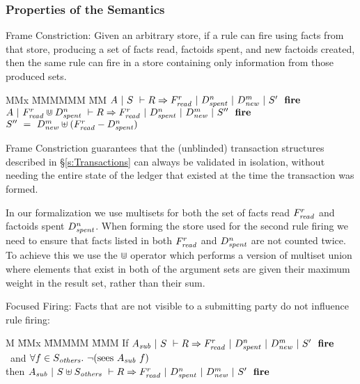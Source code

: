 \subsubsection{Properties of the Semantics}
\label{s:PropertiesOfSemantics}
\begin{theorem}
Frame Constriction:
Given an arbitrary store, if a rule can fire using facts from that store, producing a set of facts read, factoids spent, and new factoids created, then the same rule can fire in a store containing only information from those produced sets.
\end{theorem}
\begin{tabbing}
MMx \= MMMMMM \= MM \kill
{}     \> $A~|~S~\vdash R \Rightarrow F_{\mathit{read}}^r~|~D_{\mathit{spent}}^n~|~D_{\mathit{new}}^m~|~S'~~\textbf{fire}$ \\
   \> $A~|~F_{\mathit{read}}^r \Cup D_{\mathit{spent}}^n~\vdash R \Rightarrow F_{\mathit{read}}^r~|~D_{\mathit{spent}}^n~|~D_{\mathit{new}}^m~|~S''~~\textbf{fire}$ \\
             \>  $S'' ~=~ D_{\mathit{new}}^m \uplus (F_{\mathit{read}}^r - D_{\mathit{spent}}^n)$
\end{tabbing}

Frame Constriction guarantees that the (unblinded) transaction structures described in \S\ref{s:Transactions} can always be validated in isolation, without needing the entire state of the ledger that existed at the time the transaction was formed.

In our formalization we use multisets for both the set of facts read $F^r_{\mathit{read}}$ and factoids spent $D^n_{\mathit{spent}}$. When forming the store used for the second rule firing we need to ensure that facts listed in both $F^r_{\mathit{read}}$ and $D^n_{\mathit{spent}}$ are not counted twice. To achieve this we use the $\Cup$ operator which performs a version of multiset union where elements that exist in both of the argument sets are given their maximum weight in the result set, rather than their sum.


\begin{theorem}
Focused Firing: Facts that are not visible to a submitting party do not influence rule firing:
\end{theorem}
\begin{tabbing}
M \= MMx \= MMMMM \= MMM \kill
\> If     \> $A_{\mathit{sub}}~|~S~\vdash R \Rightarrow F_{\mathit{read}}^r~|~D_{\mathit{spent}}^n~|~D_{\mathit{new}}^m~|~S'~~\textbf{fire}$ \\
\> ~and   \> $\forall f \in S_{\mathit{others}}.\ \neg (\textrm{sees}~ A_{\mathit{sub}}~ f)$ \\
\> then   \> $A_{\mathit{sub}}~|~S \uplus S_{\mathit{others}}~\vdash R \Rightarrow F_{\mathit{read}}^r~|~D_{\mathit{spent}}^n~|~D_{\mathit{new}}^m~|~S'~~\textbf{fire}$
\end{tabbing}


